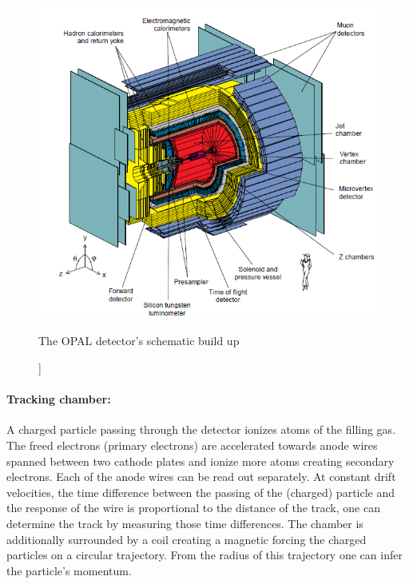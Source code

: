\begin{figure}[ht]
\centering
\includegraphics[width=1.0\linewidth]{graphics/OPALaufbau}
\caption[[Opal schematic build up]]{The OPAL detector's schematic build up}
\label{fig:OPALaufbau}
\end{figure}

\paragraph{Tracking chamber:}
A charged particle passing through the detector ionizes atoms of the filling gas. The freed electrons (primary electrons) are accelerated towards anode wires spanned between two cathode plates and ionize more atoms creating secondary electrons.
Each of the anode wires can be read out separately. At constant drift velocities, the time difference between the passing of the (charged) particle and the response of the wire is proportional to the distance of the track, one can determine the track by measuring those time differences.
The chamber is additionally surrounded by a coil creating a magnetic forcing the charged particles on a circular trajectory. From the radius of this trajectory one can infer the particle's momentum\cite{staatsex}.


